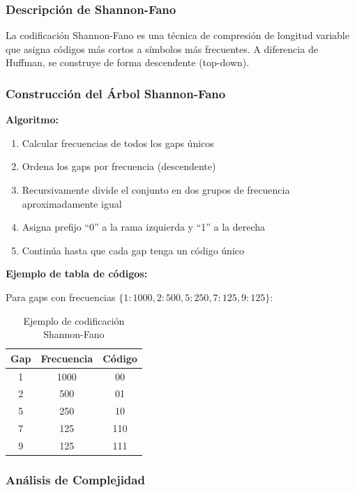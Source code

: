 \documentclass[11pt, twocolumn]{article}
\begin{document}
\subsubsection{Descripción de Shannon-Fano}

La codificación Shannon-Fano es una técnica de compresión de longitud variable que asigna códigos más cortos a símbolos más frecuentes. A diferencia de Huffman, se construye de forma descendente (top-down).

\subsubsection{Construcción del Árbol Shannon-Fano}

\textbf{Algoritmo:}

\begin{enumerate}
    \item Calcular frecuencias de todos los gaps únicos
    \item Ordena los gaps por frecuencia (descendente)
    \item Recursivamente divide el conjunto en dos grupos de frecuencia aproximadamente igual
    \item Asigna prefijo ``0'' a la rama izquierda y ``1'' a la derecha
    \item Continúa hasta que cada gap tenga un código único
\end{enumerate}

\textbf{Ejemplo de tabla de códigos:}

Para gaps con frecuencias $\{1: 1000, 2: 500, 5: 250, 7: 125, 9: 125\}$:

\begin{table}[H]
\centering
\begin{tabular}{|c|c|c|}
\hline
\textbf{Gap} & \textbf{Frecuencia} & \textbf{Código} \\
\hline
1 & 1000 & 00 \\
2 & 500 & 01 \\
5 & 250 & 10 \\
7 & 125 & 110 \\
9 & 125 & 111 \\
\hline
\end{tabular}
\caption{Ejemplo de codificación Shannon-Fano}
\end{table}

\subsubsection{Análisis de Complejidad}
\end{document}
